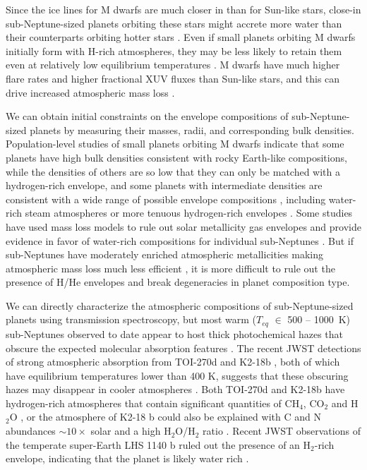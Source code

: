 \documentclass[twocolumn]{aastex631}
\begin{document}
Since the ice lines for M dwarfs are much closer in than for Sun-like stars, close-in sub-Neptune-sized planets orbiting these stars might accrete more water than their counterparts orbiting hotter stars \citep[e.g.,][]{Alibert_bez_2017,ormel_2017,bitsch_2020,kimura_2022}. Even if small planets orbiting M dwarfs initially form with H-rich atmospheres, they may be less likely to retain them even at relatively low equilibrium temperatures \citep[e.g.,][]{Hori_2020}. M dwarfs have much higher flare rates and higher fractional XUV fluxes than Sun-like stars, and this can drive increased atmospheric mass loss \citep{Roettenbacher_2017,Fleming_2020}. 

We can obtain initial constraints on the envelope compositions of sub-Neptune-sized planets by measuring their masses, radii, and corresponding bulk densities. Population-level studies of small planets orbiting M dwarfs \citep[e.g.,][]{Luque_2022} indicate that some planets have high bulk densities consistent with rocky Earth-like compositions, while the densities of others are so low that they can only be matched with a hydrogen-rich envelope, and some planets with intermediate densities are consistent with a wide range of possible envelope compositions \citep{Parc2024}, including water-rich steam atmospheres \citep{Aguichine2021,Luque_2022,Pierrehumbert2023} or more tenuous hydrogen-rich envelopes \citep{rogers_2023}. Some studies have used mass loss models to rule out solar metallicity gas envelopes and provide evidence in favor of water-rich compositions for individual sub-Neptunes \citep[e.g.,][]{Diamond-Lowe2022,Piaulet2023,Castro-Gonzalez2023}. But if  sub-Neptunes have moderately enriched atmospheric metallicities \citep[$\geq50-200\times$ solar;][]{Zhang2022} making atmospheric mass loss much less efficient \citep{Linssen2024}, it is more difficult to rule out the presence of H/He envelopes and break degeneracies in planet composition type. 

We can directly characterize the atmospheric compositions of sub-Neptune-sized planets using transmission spectroscopy, but most warm ($T_{eq}$ $\in$ 500 -- 1000~K) sub-Neptunes observed to date appear to host thick photochemical hazes that obscure the expected molecular absorption features \citep{Wallack2024,Gao2023}. The recent JWST detections of strong atmospheric absorption from TOI-270d and K2-18b \citep{Madhusudhan2023,Benneke2024}, both of which have equilibrium temperatures lower than 400 K, suggests that these obscuring hazes may disappear in cooler atmospheres \cite[e.g.,][]{Brande2024}. Both TOI-270d and K2-18b have hydrogen-rich atmospheres that contain significant quantities of CH$_4$, CO$_2$ and H$_2$O \citep[correspnding to atmospheric metallicities of $\sim100-200\times$ solar;][]{Madhusudhan2023,Wogan2024,Benneke2024}, or the atmosphere of K2-18 b could also be explained with C and N abundances $\sim10\times$ solar and a high H$_2$O/H$_2$ ratio \citep{Yang2024}. Recent JWST observations of the temperate super-Earth LHS 1140 b \citep[$T_{eq}$ = 226 K, $R_p$ = 1.73 $R_{\oplus}$,][]{Cadieux2024} ruled out the presence of an H$_2$-rich envelope, indicating that the planet is likely water rich \citep{Damiano2024}. 
\end{document}
